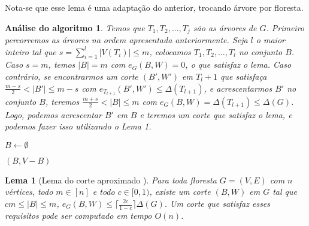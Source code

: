 \documentclass[a4paper,12pt]{article}
\newtheorem{lem}{Lema}
\newtheorem{alg}{Análise do algoritmo}
\begin{document}
\medskip

Nota-se que esse lema é uma adaptação do anterior, trocando árvore
por floresta.

\medskip

\begin{alg}
	Temos que $T_1, T_2, \ldots,T_j $ são 
	as árvores de $G$. 
	Primeiro percorremos as árvores na ordem apresentada 
	anteriormente. Seja $l$ o maior inteiro tal que 
	$s = \displaystyle\sum_{i=1}^{l}|V(T_i)| \le m$,
	colocamos $T_1,T_2, \ldots,T_l$ no conjunto $B$.
	Caso $s=m$, temos $|B|=m$ com  $e_G(B,W)=0$, o que satisfaz o lema.
	Caso contrário, se encontrarmos um corte $(B',W')$ em $T_l+1$ que
	satisfaça $\frac{m-s}{2}<|B'|\le m-s$ com $e_{T_{l+1}}(B',W') \le 
	\Delta(T_{l+1})$, e acrescentarmos $B'$ no conjunto
	$B$, teremos
	$\frac{m+s}{2}<|B| \le m$ com 
	$e_G(B,W) = \Delta(T_{l+1}) \le \Delta(G)$.
	Logo, podemos acrescentar $B'$ em $B$ e teremos um corte
	que satisfaz o lema, e podemos fazer isso utilizando o Lema 1.

\end{alg}

\begin{algorithm}[H]

	\caption{Computa corte aproximado simples}
	$B \gets \emptyset$\;

	\Return $(B,V-B)$\;

\end{algorithm}	

\bigskip
\bigskip
\bigskip
\bigskip
\bigskip
\bigskip
\bigskip
\bigskip


\begin{lem}[Lema do corte aproximado {\cite[Lemma 3]{Schmidt15}}]

	Para toda floresta $G=(V,E)$ com $n$ vértices, todo $m \in [n]$
	e todo $c \in [0,1)$,
	existe um corte $(B,W)$ em $G$ tal que 
	$cm \le |B| \le m$,
	$e_G(B,W) \le \lceil \frac{2c}{1-c}\rceil \Delta(G)$.
	Um corte que satisfaz esses requisitos pode ser computado em
	tempo $O(n)$.
\end{lem}
\end{document}

